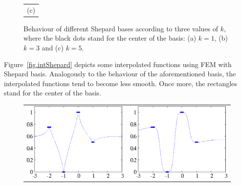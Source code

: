 \begin{figure}[!h]
\begin{tabular}{c}
(c) \\
\end{tabular}
\caption{\label{fig.elemShepard}Behaviour of different Shepard bases according to three values of $k$, where the black dots stand for the center of the basis: (a) $k=1$, (b) $k=3$ and (c) $k = 5$.}
\end{figure}

Figure~\ref{fig.intShepard} depicts some interpolated functions using FEM with Shepard basis. Analogously to the behaviour of the aforementioned basis, the interpolated functions tend to become less smooth. Once more, the rectangles stand for the center of the basis.

\begin{figure}[!h]
\centering
\begin{tabular}{cc}
\includegraphics[scale=0.153]{./intShepard1.eps} &
\includegraphics[scale=0.153]{./intShepard3.eps} \\ 

\end{tabular}
\end{figure}
